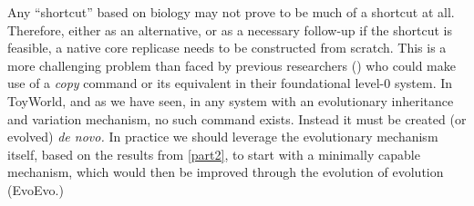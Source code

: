 Any ``shortcut'' based on biology may not prove to be much of a shortcut at all. Therefore, either as an alternative, or as a necessary follow-up if the shortcut is feasible, a native core replicase needs to be constructed from scratch. This is a more challenging problem than faced by previous researchers (\eg \cite{Hickinbotham2011, Nellis2012, Ray1991, Ofria2004, Fontana1992}) who could make use of a \emph{copy} command or its equivalent in their foundational level-0 system. In ToyWorld, and as we have seen, in any system with an evolutionary inheritance and variation mechanism, no such command exists. Instead it must be created (or evolved) \textit{de novo.} In practice we should leverage the evolutionary mechanism itself, based on the results from \cref{part2}, to start with a minimally capable mechanism, which would then be improved through the evolution of evolution (EvoEvo.)

